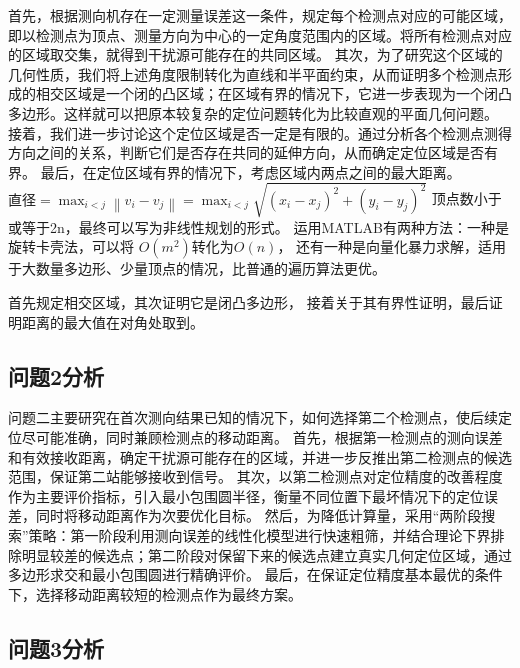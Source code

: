 \documentclass[withoutpreface,bwprint]{cumcmthesis} %
\begin{document}
首先，根据测向机存在一定测量误差这一条件，规定每个检测点对应的可能区域，即以检测点为顶点、测量方向为中心的一定角度范围内的区域。将所有检测点对应的区域取交集，就得到干扰源可能存在的共同区域。
其次，为了研究这个区域的几何性质，我们将上述角度限制转化为直线和半平面约束，从而证明多个检测点形成的相交区域是一个闭的凸区域；在区域有界的情况下，它进一步表现为一个闭凸多边形。这样就可以把原本较复杂的定位问题转化为比较直观的平面几何问题。
接着，我们进一步讨论这个定位区域是否一定是有限的。通过分析各个检测点测得方向之间的关系，判断它们是否存在共同的延伸方向，从而确定定位区域是否有界。
最后，在定位区域有界的情况下，考虑区域内两点之间的最大距离。
$\text{直径}=\max_{i<j} \left\| v_i-v_j \right\| =\max_{i<j} \sqrt{\left( x_i-x_j \right) ^2+\left( y_i-y_j \right) ^2}$
顶点数小于或等于2n，最终可以写为非线性规划的形式。
运用MATLAB有两种方法：一种是旋转卡壳法，可以将 $O(m^2)$转化为$O(n)$，
还有一种是向量化暴力求解，适用于大数量多边形、少量顶点的情况，比普通的遍历算法更优。

首先规定相交区域，其次证明它是闭凸多边形，
接着关于其有界性证明，最后证明距离的最大值在对角处取到。
\subsection{问题2分析}
问题二主要研究在首次测向结果已知的情况下，如何选择第二个检测点，使后续定位尽可能准确，同时兼顾检测点的移动距离。
首先，根据第一检测点的测向误差和有效接收距离，确定干扰源可能存在的区域，并进一步反推出第二检测点的候选范围，保证第二站能够接收到信号。
其次，以第二检测点对定位精度的改善程度作为主要评价指标，引入最小包围圆半径，衡量不同位置下最坏情况下的定位误差，同时将移动距离作为次要优化目标。
然后，为降低计算量，采用“两阶段搜索”策略：第一阶段利用测向误差的线性化模型进行快速粗筛，并结合理论下界排除明显较差的候选点；第二阶段对保留下来的候选点建立真实几何定位区域，通过多边形求交和最小包围圆进行精确评价。
最后，在保证定位精度基本最优的条件下，选择移动距离较短的检测点作为最终方案。
\subsection{问题3分析}
\end{document}
